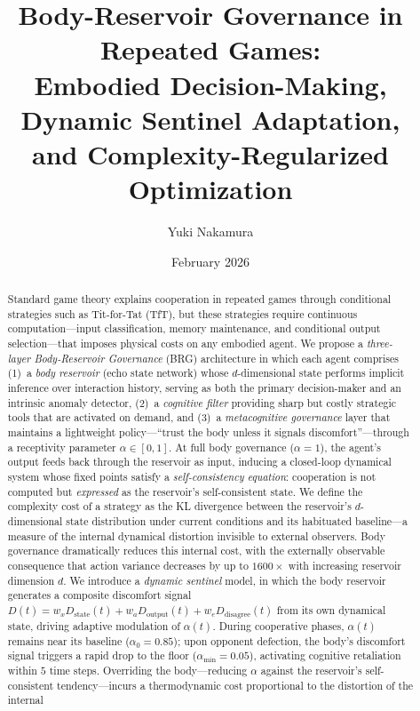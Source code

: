 \documentclass[11pt,a4paper]{article}
\title{Body-Reservoir Governance in Repeated Games:\\
  Embodied Decision-Making, Dynamic Sentinel Adaptation,\\
  and Complexity-Regularized Optimization}
\author{Yuki Nakamura}
\affil{The Open University of Japan\\
  \texttt{sinwisoa@gmail.com},\quad \texttt{2310082261@campus.ouj.ac.jp}}
\date{February 2026}
\theoremstyle{definition}
\begin{document}
\maketitle

\begin{abstract}
Standard game theory explains cooperation in repeated games through conditional strategies
such as Tit-for-Tat (TfT), but these strategies require continuous computation---input
classification, memory maintenance, and conditional output selection---that imposes
physical costs on any embodied agent.  We propose a \emph{three-layer Body-Reservoir
Governance} (BRG) architecture in which each agent comprises (1)~a \emph{body reservoir}
(echo state network) whose $d$-dimensional state performs implicit inference over
interaction history, serving as both the primary decision-maker and an intrinsic
anomaly detector, (2)~a \emph{cognitive filter} providing sharp but costly strategic
tools that are activated on demand, and (3)~a \emph{metacognitive governance} layer that
maintains a lightweight policy---``trust the body unless it signals discomfort''---through
a receptivity parameter $\alpha \in [0,1]$.
At full body governance ($\alpha = 1$), the agent's output feeds back through the
reservoir as input, inducing a closed-loop dynamical system whose fixed points satisfy a
\emph{self-consistency equation}: cooperation is not computed but \emph{expressed} as the
reservoir's self-consistent state.
We define the complexity cost of a strategy as the KL divergence between the reservoir's
$d$-dimensional state distribution under current conditions and its habituated baseline---a
measure of the internal dynamical distortion invisible to external observers.
Body governance dramatically reduces this internal cost, with the externally observable
consequence that action variance decreases by up to $1600\times$ with increasing
reservoir dimension $d$.
We introduce a \emph{dynamic sentinel} model, in which the body reservoir
generates a composite discomfort signal
$D(t) = w_x D_{\mathrm{state}}(t) + w_a D_{\mathrm{output}}(t) + w_e D_{\mathrm{disagree}}(t)$
from its own dynamical state, driving adaptive modulation of $\alpha(t)$.
During cooperative phases, $\alpha(t)$ remains near its baseline ($\alpha_0 = 0.85$);
upon opponent defection, the body's discomfort signal triggers a rapid drop to the
floor ($\alpha_{\min} = 0.05$), activating cognitive retaliation within $5$ time steps.
Overriding the body---reducing $\alpha$ against the reservoir's self-consistent
tendency---incurs a thermodynamic cost proportional to the distortion of the internal

\end{abstract}
\end{document}
